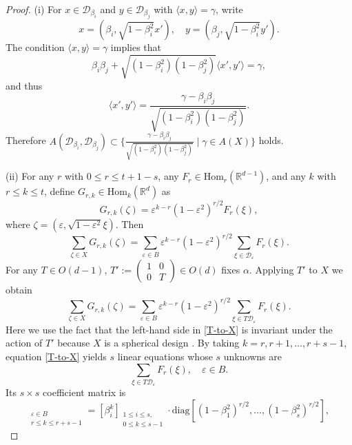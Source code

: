 \documentclass[11pt]{article}
\theoremstyle{definition}
\theoremstyle{remark}
\begin{document}
\begin{proof}

(i) For $x\in \mathcal{D}_{\beta_i}$ and $y\in \mathcal{D}_{\beta_j}$ with $\langle x,y\rangle=\gamma$, write $$
x=(\beta_i,\sqrt{1-\beta_i^2}x'),\quad y=(\beta_j,\sqrt{1-\beta_i^2}y').$$
The condition $\langle x,y\rangle=\gamma$ implies that 
$$
\beta_i \beta_j+\sqrt{(1-\beta_i^2)(1-\beta_j^2)}\langle x',y'\rangle=\gamma,
$$
and thus $$
\langle x',y'\rangle=\frac{\gamma-\beta_i \beta_j}{\sqrt{(1-\beta_i^2)(1-\beta_j^2)}}. 
$$
Therefore $A(\mathcal{D}_{\beta_i},\mathcal{D}_{\beta_j})\subset \Big\{\frac{\gamma-\beta_i \beta_j}{\sqrt{(1-\beta_i^2)(1-\beta_j^2)}} \mid \gamma\in A(X)\Big\}$ holds. 



(ii) For any $r$ with $0\leq r \leq t+1-s$, any $F_r\in\text{Hom}_{r}(\mathbb{R}^{d-1})$, and any $k$ with $r\leq k\leq t$, define $G_{r,k}\in\text{Hom}_k(\mathbb{R}^d)$ as 
\begin{equation*}
G_{r,k}(\zeta)=\varepsilon^{k-r}(1-\varepsilon^2)^{r/2}F_r(\xi),
\end{equation*}
where $\zeta=(\varepsilon,\sqrt{1-\varepsilon^2}\xi)$. 
Then 
\begin{equation*}
\sum_{\zeta\in X}G_{r,k}(\zeta)=\sum_{\varepsilon\in B}\varepsilon^{k-r}(1-\varepsilon^2)^{r/2}\sum_{\xi \in \mathcal{D}_{\varepsilon}}F_r(\xi).
\end{equation*} 
For any $T\in O(d-1)$, $T':=\begin{pmatrix} 1 & 0 \\ 0 & T\end{pmatrix}\in O(d)$ fixes $\alpha$. Applying $T'$ to $X$ we obtain 
\begin{equation}\label{T-to-X}
\sum_{\zeta\in X}G_{r,k}(\zeta)=\sum_{\varepsilon\in B}\varepsilon^{k-r}(1-\varepsilon^2)^{r/2}\sum_{\xi \in T\mathcal{D}_{\varepsilon}}F_r(\xi). 
\end{equation}
Here we use the fact that the left-hand side in \eqref{T-to-X} is invariant under the action of $T'$ because $X$ is a spherical design \cite{DGS77}. By taking $k=r,r+1,\ldots,r+s-1$, equation \eqref{T-to-X} yields $s$ linear equations whose $s$ unknowns are 
\begin{equation*}
\sum_{\xi \in T\mathcal{D}_{\varepsilon}}F_r(\xi),\quad \varepsilon \in B.
\end{equation*} 
Its $s\times s$ coefficient matrix is 
\begin{equation*}
[\varepsilon^{k-r}(1-\varepsilon^2)^{r/2}]_{\substack{\varepsilon\in B\\ r\leq k\leq r+s-1}}=[\beta_i^{k}]_{\substack{1\leq i\leq s,\\ 0\leq k\leq s-1}}\cdot \text{diag}[(1-\beta_1^2)^{r/2},\ldots,(1-\beta_s^2)^{r/2}],

\end{equation*}
\end{proof}
\end{document}
